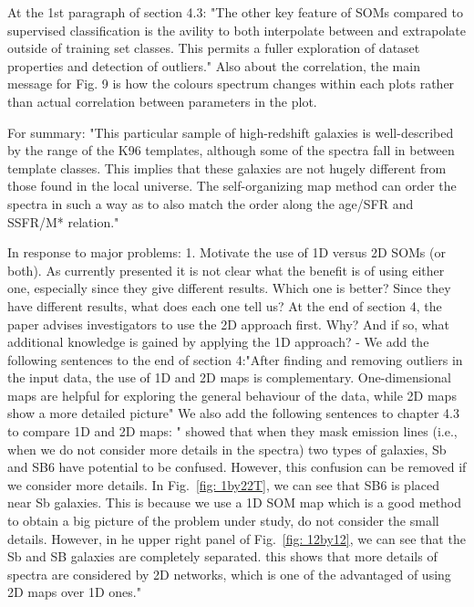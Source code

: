 	 At the 1st paragraph of section 4.3: 
	 "The other key feature of SOMs compared to supervised classification is the avility to both interpolate between and extrapolate outside of training set classes. 
 	 This permits a fuller exploration of dataset properties and detection of outliers."
 	 Also about the correlation,  the main message for Fig. 9 is how the colours spectrum changes within each plots rather than actual correlation between parameters in the plot.
 
	For summary:
 	"This particular sample of high-redshift galaxies is well-described by the range of the K96 templates, although some of the spectra fall in between template classes. This implies that these galaxies are not hugely different from those found in the local universe. The self-organizing map method can order the spectra in such a way as to also match the order along the age/SFR and SSFR/M* relation."

In response to major problems:
1.	Motivate the use of 1D versus 2D SOMs (or both).  As currently presented it is not clear what the benefit is of using either one, especially since they give different results.  Which one is better? Since they have different results, what does each one tell us?  At the end of section 4, the paper advises investigators to use the 2D approach first.  Why?  And if so, what additional knowledge is gained by applying the 1D approach? 
	-  We add the following sentences to the end of section 4:"After finding and removing outliers in the input data, the use of 1D and 2D maps is complementary. One-dimensional maps are helpful for exploring the general behaviour of the data, while 2D maps show a more detailed picture"
	We also add the following sentences to chapter 4.3 to compare 1D and 2D maps:
	" showed that when they mask emission lines (i.e., when we do not consider more details in the spectra) two types of galaxies, Sb and SB6 have potential to be confused.
    However, this confusion can be removed if we consider more details. 
    In Fig.~\ref{fig: 1by22T}, we can see that SB6 is placed near Sb galaxies. 
    This is because we use a 1D SOM map which is a good method to obtain a big picture of the problem under study, do not consider the small details. 
    However, in he upper right panel of Fig.~\ref{fig: 12by12}, we can see that the Sb and SB galaxies are completely separated. 
    this shows that more details of spectra are considered by 2D networks, which is one of the advantaged of using 2D maps over 1D ones."

